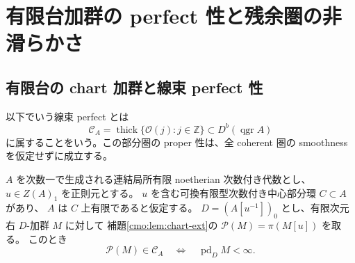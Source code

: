 \section{有限台加群の perfect 性と残余圏の非滑らかさ}
\label{mix:sec:perfect-modules}

\subsection{有限台の chart 加群と線束 perfect 性}

以下でいう線束 perfect とは
\[
 \mathcal C_A=\operatorname{thick}\{\mathcal O(j):j\in\mathbb Z\}
 \subset D^b(\operatorname{qgr}A)
\]
に属することをいう。この部分圏の proper 性は、全 coherent 圏の
smoothness を仮定せずに成立する。

\begin{lemma}
\label{cmo:lem:finite-support-perfect}
$A$ を次数一で生成される連結局所有限 noetherian 次数付き代数とし、
$u\in Z(A)_1$ を正則元とする。
$u$ を含む可換有限型次数付き中心部分環 $C\subset A$ があり、
$A$ は $C$ 上有限であると仮定する。
$D=(A[u^{-1}])_0$ とし、有限次元右 $D$-加群 $M$ に対して
補題\ref{cmo:lem:chart-ext}の $\mathcal P(M)=\pi(M[u])$ を取る。
このとき
\begin{equation}\label{cmo:eq:chart-perfect-iff}
 \mathcal P(M)\in\mathcal C_A
 \quad\Longleftrightarrow\quad
 \operatorname{pd}_{D}M<\infty.
\end{equation}
\end{lemma}
